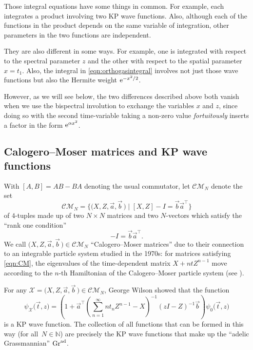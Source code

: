 \documentclass[10pt,a4paper]{amsart}
\numberwithin{equation}{section}
\theoremstyle{definition}
\def\vt{\vec{t}}
\def\X{\mathcal{X}}
\def\CM{\mathcal{C\!M}}
\def\N{\mathbb{N}}
\begin{document}
Those integral equations have some things in common. For example, each integrates
a product involving two KP wave functions. Also, although each of the functions in
the product depends on the same variable of integration, other
parameters in the two functions are independent.

They are
also different in some ways. For example, one is integrated with respect to the
spectral parameter $z$ and the other with respect to the spatial
parameter $x=t_1$. Also, the integral in \eqref{eqn:orthogasintegral}
involves not just those wave functions but also the Hermite weight ${\rm e}^{-x^2/2}$.

However, as we will see below, the two differences described above
both vanish when we use the bispectral involution \cite{WilsonBisp} to
exchange the variables $x$ and $z$, since doing so with the second
time-variable taking a non-zero value \textit{fortuitously}
inserts a factor in the form ${\rm e}^{\alpha x^2}$.

\subsection{Calogero--Moser matrices and KP wave functions}

With $[A,B]=AB-BA$ denoting the usual commutator,
let $\CM_N$ denote the set
\[
\CM_N=\big\{\bigl(X,Z,\vec a,\vec b\,\bigr)\mid [X,Z]-I=\vec b\vec a^{\top}\big\}
\]
of $4$-tuples made up of two $N\times N$ matrices and two $N$-vectors which satisfy
the ``rank one condition''
\begin{equation}
 [X,Z]-I=\vec b\vec a^{\top}.\label{eqn:CM}
\end{equation}
 We call $\bigl(X,Z,\vec a,\vec b\,\bigr)\in \CM_N$ ``Calogero--Moser matrices''
 due to their connection to an integrable particle
system studied in the 1970s: for matrices satisfying \eqref{eqn:CM},
the eigenvalues of the time-dependent matrix $X+ntZ^{n-1}$ move according
to the $n$-th Hamiltonian of the Calogero--Moser particle system (see \cite{KKZ,WilsonCM}).


For any $\X=\bigl(X,Z,\vec a,\vec b\,\bigr)\in \CM_N$,
George Wilson \cite{WilsonCM} showed that the function
\begin{equation}
\psi_{\X}\bigl(\vt,z\bigr)=\left(1+\vec a^{\top}\left(\sum_{n=1}^{\infty}
 nt_nZ^{n-1}-X\right)^{-1}(zI-Z)^{-1}\vec b\right)\psi_0\bigl(\vt,z\bigr)
 \label{eqn:psiXZ}
 \end{equation}
is a KP wave function.
The collection of all functions that can be formed in this way (for all~$N\in \N$) are precisely the KP wave
 functions that make up the ``adelic Grassmannian'' ${\rm Gr}^{\rm ad}$.
\end{document}
